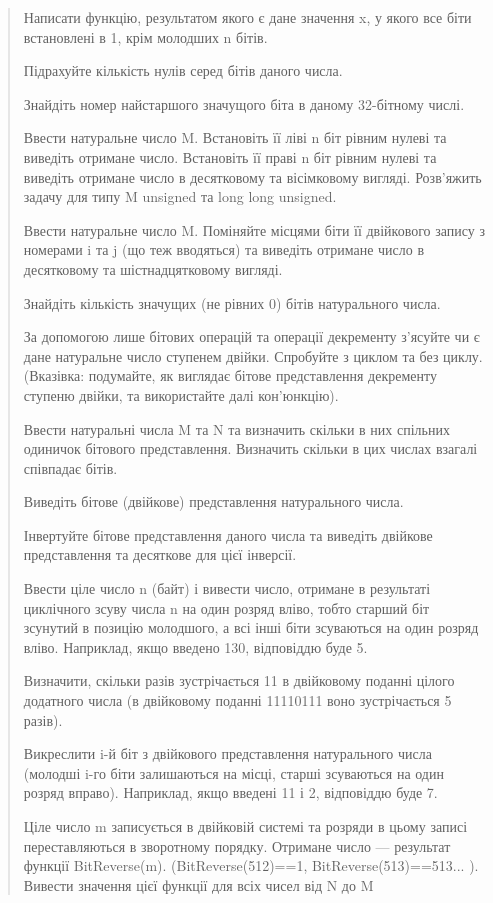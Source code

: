 \documentclass[]{article}
\begin{document}
\begin{quote}
Написати функцію, результатом якого є дане значення x, у якого все біти
встановлені в 1, крім молодших n бітів.

Підрахуйте кількість нулів серед бітів даного числа.

Знайдіть номер найстаршого значущого біта в даному 32-бітному числі.

Ввести натуральне число M. Встановіть її ліві n біт рівним нулеві та
виведіть отримане число. Встановіть її праві n біт рівним нулеві та
виведіть отримане число в десятковому та вісімковому вигляді. Розв'яжить
задачу для типу M unsigned та long long unsigned.

Ввести натуральне число M. Поміняйте місцями біти її двійкового запису з
номерами i та j (що теж вводяться) та виведіть отримане число в
десятковому та шістнадцятковому вигляді.

Знайдіть кількість значущих (не рівних 0) бітів натурального числа.

За допомогою лише бітових операцій та операції декременту з'ясуйте чи є
дане натуральне число ступенем двійки. Спробуйте з циклом та без циклу.
(Вказівка: подумайте, як виглядає бітове представлення декременту
ступеню двійки, та використайте далі кон'юнкцію).

Ввести натуральні числа M та N та визначить скільки в них спільних
одиничок бітового представлення. Визначить скільки в цих числах взагалі
співпадає бітів.

Виведіть бітове (двійкове) представлення натурального числа.

Інвертуйте бітове представлення даного числа та виведіть двійкове
представлення та десяткове для цієї інверсії.

Ввести ціле число n (байт) і вивести число, отримане в результаті
циклічного зсуву числа n на один розряд вліво, тобто старший біт
зсунутий в позицію молодшого, а всі інші біти зсуваються на один розряд
вліво. Наприклад, якщо введено 130, відповіддю буде 5.

Визначити, скільки разів зустрічається 11 в двійковому поданні цілого
додатного числа (в двійковому поданні 11110111 воно зустрічається 5
разів).

Викреслити i-й біт з двійкового представлення натурального числа
(молодші i-го біти залишаються на місці, старші зсуваються на один
розряд вправо). Наприклад, якщо введені 11 і 2, відповіддю буде 7.

Ціле число m записується в двійковій системі та розряди в цьому записі
переставляються в зворотному порядку. Отримане число --- результат
функції BitReverse(m). (BitReverse(512)==1, BitReverse(513)==513... ).
Вивести значення цієї функції для всіх чисел від N до M


\end{quote}
\end{document}
